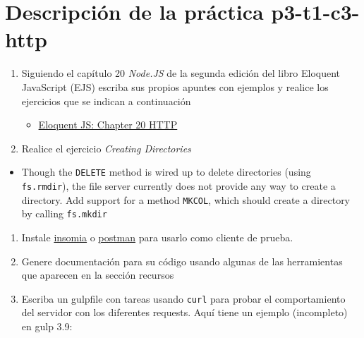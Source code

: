 \documentclass[]{article}
\date{}
\providecommand{\tightlist}{%
  \setlength{\itemsep}{0pt}\setlength{\parskip}{0pt}}
\begin{document}
\hypertarget{descripciuxf3n-de-la-pruxe1ctica-p3-t1-c3-http}{%
\section{Descripción de la práctica
p3-t1-c3-http}\label{descripciuxf3n-de-la-pruxe1ctica-p3-t1-c3-http}}

\begin{enumerate}
\def\labelenumi{\arabic{enumi}.}
\tightlist
\item
  Siguiendo el capítulo 20 \emph{Node.JS} de la segunda edición del
  libro Eloquent JavaScript (EJS) escriba sus propios apuntes con
  ejemplos y realice los ejercicios que se indican a continuación

  \begin{itemize}
  \tightlist
  \item
    \href{http://eloquentjavascript.net/2nd_edition/20_node.html}{Eloquent
    JS: Chapter 20 HTTP}
  \end{itemize}
\item
  Realice el ejercicio \emph{Creating Directories}
\end{enumerate}

\begin{itemize}
\tightlist
\item
  Though the \texttt{DELETE} method is wired up to delete directories
  (using \texttt{fs.rmdir}), the file server currently does not provide
  any way to create a directory. Add support for a method
  \texttt{MKCOL}, which should create a directory by calling
  \texttt{fs.mkdir}
\end{itemize}

\begin{enumerate}
\def\labelenumi{\arabic{enumi}.}
\setcounter{enumi}{3}
\tightlist
\item
  Instale \href{https://insomnia.rest/}{insomia} o
  \href{https://www.getpostman.com/}{postman} para usarlo como cliente
  de prueba.
\item
  Genere documentación para su código usando algunas de las herramientas
  que aparecen en la sección recursos
\item
  Escriba un gulpfile con tareas usando \texttt{curl} para probar el
  comportamiento del servidor con los diferentes requests. Aquí tiene un
  ejemplo (incompleto) en gulp 3.9:
\end{enumerate}
\end{document}
